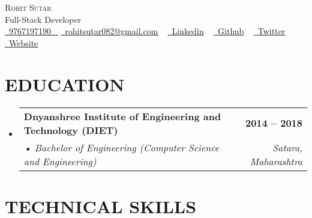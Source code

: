 \documentclass[letterpaper,11pt]{article}
\makeatletter
\newcommand{\resumeSubheading}[4]{
  \vspace{-2pt}\item
    \begin{tabular*}{1.0\textwidth}[t]{l@{\extracolsep{\fill}}r}
      \textbf{\large#1} & \textbf{\small #2} \\
      \textit{\large#3} & \textit{\small #4} \\
      
    \end{tabular*}\vspace{-7pt}
}
\newcommand{\resumeSubHeadingListStart}{\begin{itemize}[leftmargin=0.0in, label={}]}
\newcommand{\resumeSubHeadingListEnd}{\end{itemize}}
\makeatother
\begin{document}
\begin{center}
    {\Huge \scshape Rohit Sutar} \\ \vspace{2pt}
    \large Full-Stack Developer \\ \vspace{6pt}
    \small \href{tel:9767197190}{ \raisebox{-0.1\height}\faPhone\ \underline{9767197190} ~} \href{mailto:rohitsutar082@gmail.com}{\raisebox{-0.2\height}\faEnvelope\  \underline{rohitsutar082@gmail.com}} ~ 
    \href{https://www.linkedin.com/in/rohit-sutar-89687a1b6}{\raisebox{-0.2\height}\faLinkedinSquare\ \underline{Linkedin}}  ~
    \href{https://github.com/sutarrohit}{\raisebox{-0.2\height}\faGithub\ \underline{Github}} ~
    \href{https://twitter.com/imSrohitS}{\raisebox{-0.2\height}\faTwitter\ \underline{Twitter}} ~
     \href{https://developer-profile-gamma.vercel.app}{\raisebox{-0.2\height}\faExternalLink\ \underline{Website}} ~

\end{center}
 \vspace{-3mm}



 
\section{EDUCATION}
 \vspace{5pt}
  \resumeSubHeadingListStart
    \resumeSubheading
      {Dnyanshree Institute of Engineering and Technology (DIET)}{2014 – 2018}
      {•	Bachelor of Engineering (Computer Science and Engineering) }{Satara, Maharashtra}
 \vspace{-3pt}
  \resumeSubHeadingListEnd
  

\section{TECHNICAL SKILLS}
\vspace{2pt}
\end{document}

